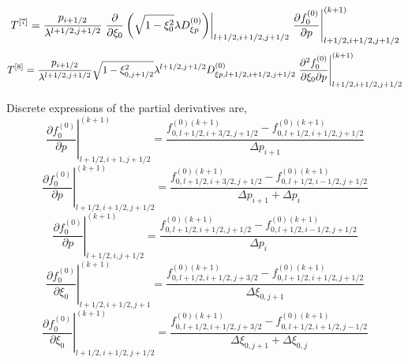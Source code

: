 \begin{equation}
T^{\left[ 7\right] }=\frac{p_{i+1/2}}{\lambda^{l+1/2,j+1/2}}\left. \frac{%
\partial}{\partial\xi_{0}}\left( \sqrt{1-\xi_{0}^{2}}\lambda D_{\xi
p}^{\left( 0\right) }\right) \right| _{l+1/2,i+1/2,j+1/2}\left. \frac{%
\partial f_{0}^{\left( 0\right) }}{\partial p}\right|
_{l+1/2,i+1/2,j+1/2}^{(k+1)}
\end{equation}
\begin{equation}
T^{\left[ 8\right] }=\frac{p_{i+1/2}}{\lambda^{l+1/2,j+1/2}}\sqrt {%
1-\xi_{0,j+1/2}^{2}}\lambda^{l+1/2,j+1/2}D_{\xi p,l+1/2,i+1/2,j+1/2}^{\left(
0\right) }\left. \frac{\partial^{2}f_{0}^{\left( 0\right) }}{\partial
\xi_{0}\partial p}\right| _{l+1/2,i+1/2,j+1/2}^{(k+1)}
\end{equation}

Discrete expressions of the partial derivatives are, 
\begin{equation}
\left. \frac{\partial f_{0}^{\left( 0\right) }}{\partial p}\right|
_{l+1/2,i+1,j+1/2}^{(k+1)}=\frac{f_{0,l+1/2,i+3/2,j+1/2}^{\left( 0\right)
(k+1)}-f_{0,l+1/2,i+1/2,j+1/2}^{\left( 0\right) (k+1)}}{\Delta p_{i+1}}
\end{equation}
\begin{equation}
\left. \frac{\partial f_{0}^{\left( 0\right) }}{\partial p}\right|
_{l+1/2,i+1/2,j+1/2}^{(k+1)}=\frac{f_{0,l+1/2,i+3/2,j+1/2}^{\left( 0\right)
(k+1)}-f_{0,l+1/2,i-1/2,j+1/2}^{\left( 0\right) (k+1)}}{\Delta
p_{i+1}+\Delta p_{i}}  \label{dfdp_ij}
\end{equation}
\begin{equation}
\left. \frac{\partial f_{0}^{\left( 0\right) }}{\partial p}\right|
_{l+1/2,i,j+1/2}^{(k+1)}=\frac{f_{0,l+1/2,i+1/2,j+1/2}^{\left( 0\right)
(k+1)}-f_{0,l+1/2,i-1/2,j+1/2}^{\left( 0\right) (k+1)}}{\Delta p_{i}}
\label{dfdp_imj}
\end{equation}
\begin{equation}
\left. \frac{\partial f_{0}^{\left( 0\right) }}{\partial\xi_{0}}\right|
_{l+1/2,i+1/2,j+1}^{(k+1)}=\frac{f_{0,l+1/2,i+1/2,j+3/2}^{\left( 0\right)
(k+1)}-f_{0,l+1/2,i+1/2,j+1/2}^{\left( 0\right) (k+1)}}{\Delta\xi_{0,j+1}}
\end{equation}
\begin{equation}
\left. \frac{\partial f_{0}^{\left( 0\right) }}{\partial\xi_{0}}\right|
_{l+1/2,i+1/2,j+1/2}^{(k+1)}=\frac{f_{0,l+1/2,i+1/2,j+3/2}^{\left( 0\right)
(k+1)}-f_{0,l+1/2,i+1/2,j-1/2}^{\left( 0\right) (k+1)}}{\Delta\xi
_{0,j+1}+\Delta\xi_{0,j}}  \label{dfdxi_ij}
\end{equation}
